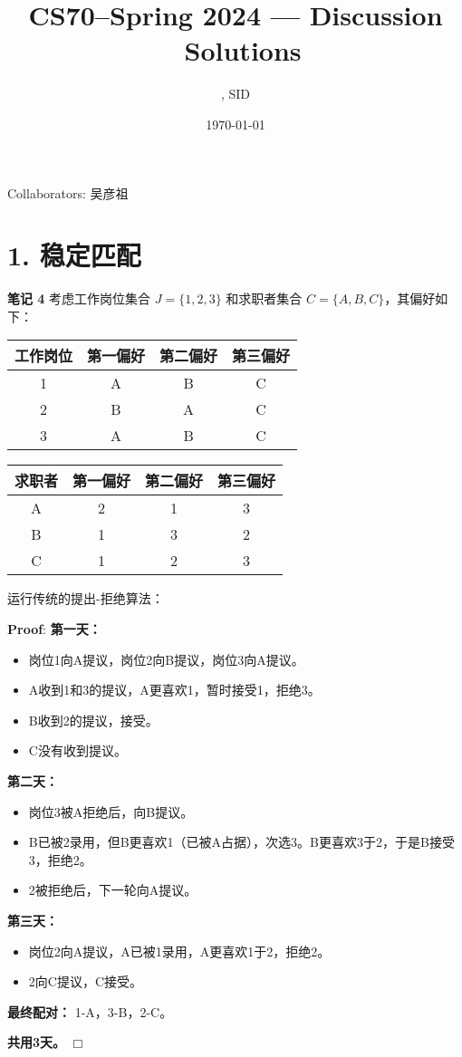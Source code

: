 \documentclass[11pt]{article}
\title{CS70--Spring 2024 --- Discussion \Homework \ Solutions}
\author{\Name, SID \SID}
\date{\today}
\def\endproofmark{$\Box$}
\newenvironment{proof}{\par{\bf Proof}:}{\endproofmark\smallskip}
\begin{document}
\maketitle

Collaborators: 吴彦祖

\section*{1. 稳定匹配}
\textbf{笔记 4}
考虑工作岗位集合 $J = \{1, 2, 3\}$ 和求职者集合 $C = \{A, B, C\}$，其偏好如下：

\begin{center}
\begin{tabular}{c|ccc}
工作岗位 & 第一偏好 & 第二偏好 & 第三偏好 \\
\hline
1 & A & B & C \\
2 & B & A & C \\
3 & A & B & C \\
\end{tabular}
\end{center}

\begin{center}
\begin{tabular}{c|ccc}
求职者 & 第一偏好 & 第二偏好 & 第三偏好 \\
\hline
A & 2 & 1 & 3 \\
B & 1 & 3 & 2 \\
C & 1 & 2 & 3 \\
\end{tabular}
\end{center}

运行传统的提出-拒绝算法：

\begin{proof}
\textbf{第一天：}
\begin{itemize}
  \item 岗位1向A提议，岗位2向B提议，岗位3向A提议。
  \item A收到1和3的提议，A更喜欢1，暂时接受1，拒绝3。
  \item B收到2的提议，接受。
  \item C没有收到提议。
\end{itemize}

\textbf{第二天：}
\begin{itemize}
  \item 岗位3被A拒绝后，向B提议。
  \item B已被2录用，但B更喜欢1（已被A占据），次选3。B更喜欢3于2，于是B接受3，拒绝2。
  \item 2被拒绝后，下一轮向A提议。
\end{itemize}

\textbf{第三天：}
\begin{itemize}
  \item 岗位2向A提议，A已被1录用，A更喜欢1于2，拒绝2。
  \item 2向C提议，C接受。
\end{itemize}

\textbf{最终配对：}
1-A，3-B，2-C。

\textbf{共用3天。}
\end{proof}
\end{document}
